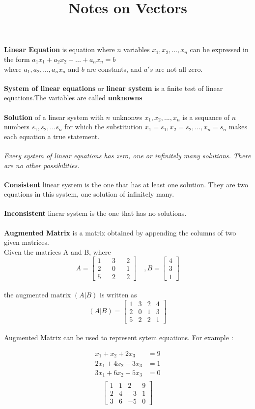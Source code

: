 \documentclass[a4paper, 12pt]{article}
\title{Notes on Vectors}
\begin{document}
 
\textbf{Linear Equation}
is equation where $n$ variables $x_1, x_2, ..., x_n$  can be expressed in the form
$a_1x_1 + a_2x_2 + ... + a_nx_n = b $ \\
where $a_1, a_2, ..., a_nx_n$ and $b$ are constants, and $a's$  are not all zero.
\\
\\
\textbf{System of linear equations} or \textbf{linear system} is a finite test of 
linear equations.The variables are called \textbf{unknowns}
\\
\\
\textbf{Solution} of a linear system with $n$ unknonws $x_1, x_2, ... , x_n$ is 
a sequance of $n$ numbers  $s_1, s_2, ... s_n$ for which the substitution
$x_1 = s_1, x_2 = s_2, ..., x_n = s_n$
makes each equation a true statement.
\\
\\
\textit{Every system of linear equations has zero, one or infinitely many solutions.
There are no other possibilities.}
\\
\\
\textbf{Consistent} linear system is the one that has at least one solution.
They are two equations in this system,  one solution of infinitely many.
\\
\\
\textbf{Inconsistent} linear system is the one that has no solutions.
\\
\\ 
\textbf{Augmented Matrix} is a matrix obtained by appending the columns of 
two given matrices.\\
Given the matrices A and B, where
$$
A =
\begin{bmatrix}
1 && 3 && 2 \\
2 && 0 && 1 \\
5 && 2 && 2
\end{bmatrix}
\quad
, B = 
\begin{bmatrix}
4 \\
3 \\
1
\end{bmatrix}
$$
\\
the augmented matrix $(A|B)$ is written as
$$
(A|B) = 
\begin{bmatrix}
1 & 3 & 2 & 4\\
2 & 0 & 1 & 3\\
5 & 2 & 2 & 1
\end{bmatrix}
$$
\\
Augmented Matrix can be used to represent sytem equations.
For example :
\begin{multicols}{2}
\begin{align*}
x_1 + x_2 + 2x_3 &= 9 \\
2x_1 + 4x_2 - 3x_3 &= 1 \\
3x_1 + 6x_2 - 5x_3 &= 0\\
\end{align*}
\break
\[ \left[ {\begin{array}{cccc}
1 & 1 & 2 & 9 \\
2 & 4 & -3 & 1 \\
3 & 6 & -5 & 0
\end{array}} \right] \]
\end{multicols}
\end{document}
